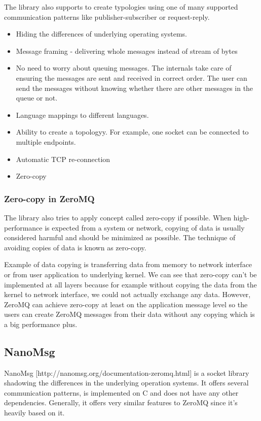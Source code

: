 The library also supports to create typologies using one of many supported communication patterns like publisher-subscriber or request-reply.
\begin{itemize}
	\item Hiding the differences of underlying operating systems.
	\item Message framing - delivering whole messages instead of stream of bytes
	\item No need to worry about queuing messages. The internals take care of ensuring the messages are sent and received in correct order. The user can send the messages without knowing whether there are other messages in the queue or not.
	\item Language mappings to different languages.
	\item Ability to create a topologyy. For example, one socket can be connected to multiple endpoints.
	\item Automatic TCP re-connection
	\item Zero-copy
\end{itemize}
\subsubsection{Zero-copy in ZeroMQ}
The library also tries to apply concept called zero-copy if possible. When high-performance is expected from a system or network, copying of data is usually considered harmful and should be minimized as possible. The technique of avoiding copies of data is known as zero-copy.

Example of data copying is transferring data from memory to network interface or from user application to underlying kernel.  We can see that zero-copy can't be implemented at all layers because for example without copying the data from the kernel to network interface, we could not actually exchange any data. However, ZeroMQ can achieve zero-copy at least on the application message level so the users can create ZeroMQ messages from their data without any copying which is a big performance plus.
\subsection{NanoMsg}
\label{sec:nanomsg}
NanoMsg [http://nanomsg.org/documentation-zeromq.html] is a socket library shadowing the differences in the underlying operation systems. It offers several communication patterns, is implemented on C and does not have any other dependencies. Generally, it offers very similar features to ZeroMQ since it's heavily based on it.

